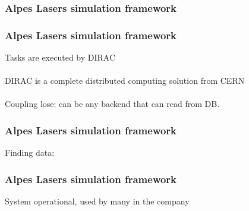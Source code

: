 \documentclass[14pt]{beamer}
\begin{document}
\begin{frame}
\frametitle{Alpes Lasers simulation framework}

\end{frame}

\begin{frame}
\frametitle{Alpes Lasers simulation framework}
Tasks are executed by DIRAC\\
~\\
DIRAC is a complete distributed computing solution from CERN\\
~\\
Coupling lose: can be any backend that can read from DB.
\end{frame}

\begin{frame}
\frametitle{Alpes Lasers simulation framework}
Finding data:

\end{frame}

\begin{frame}
\frametitle{Alpes Lasers simulation framework}
System operational, used by many in the company
\end{frame}
\end{document}
